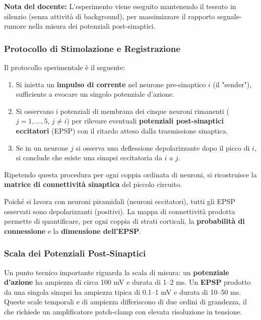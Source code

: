 \begin{tcolorbox}[colback=gray!5, colframe=gray!40, arc=2mm, boxrule=0.5pt]
\textbf{Nota del docente:} L'esperimento viene eseguito mantenendo il tessuto in silenzio (senza attività di background), per massimizzare il rapporto segnale-rumore nella misura dei potenziali post-sinaptici.
\end{tcolorbox}

\subsubsection{Protocollo di Stimolazione e Registrazione}

Il protocollo sperimentale è il seguente:

\begin{enumerate}
    \item Si inietta un \textbf{impulso di corrente} nel neurone pre-sinaptico $i$ (il "sender"), sufficiente a evocare un singolo potenziale d'azione.
    \item Si osservano i potenziali di membrana dei cinque neuroni rimanenti ($j = 1, \ldots, 5$, $j \neq i$) per rilevare eventuali \textbf{potenziali post-sinaptici eccitatori} (EPSP) con il ritardo atteso dalla trasmissione sinaptica.
    \item Se in un neurone $j$ si osserva una deflessione depolarizzante dopo il picco di $i$, si conclude che esiste una sinapsi eccitatoria da $i$ a $j$.
\end{enumerate}

Ripetendo questa procedura per ogni coppia ordinata di neuroni, si ricostruisce la \textbf{matrice di connettività sinaptica} del piccolo circuito.

Poiché si lavora con neuroni piramidali (neuroni eccitatori), tutti gli EPSP osservati sono depolarizzanti (positivi). La mappa di connettività prodotta permette di quantificare, per ogni coppia di strati corticali, la \textbf{probabilità di connessione} e la \textbf{dimensione dell'EPSP}.

\subsubsection{Scala dei Potenziali Post-Sinaptici}

Un punto tecnico importante riguarda la scala di misura: un \textbf{potenziale d'azione} ha ampiezza di circa 100 mV e durata di 1–2 ms. Un \textbf{EPSP} prodotto da una singola sinapsi ha ampiezza tipica di 0.1–1 mV e durata di 10–50 ms. Queste scale temporali e di ampiezza differiscono di due ordini di grandezza, il che richiede un amplificatore patch-clamp con elevata risoluzione in tensione.

